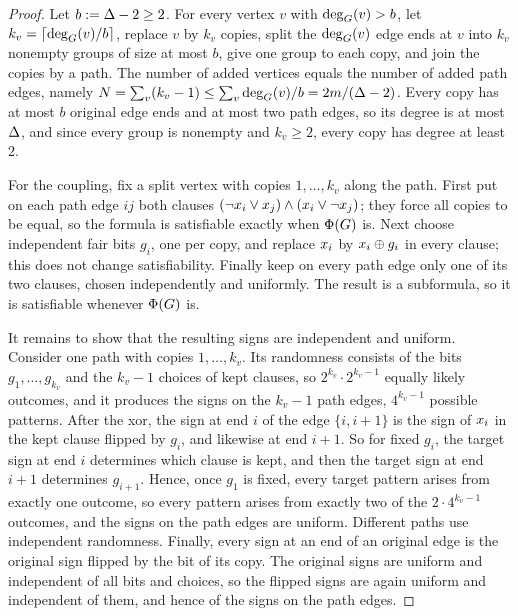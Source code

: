 \documentclass[11pt,a4paper]{article}
\theoremstyle{definition}
\theoremstyle{remark}
\theoremstyle{plain}
\theoremstyle{definition}
\begin{document}
\begin{proof}
Let \(b:=\Delta-2\ge2\). For every vertex \(v\) with \(\deg_{G}(v)>b\), let
\(k_v=\lceil\deg_{G}(v)/b\rceil\), replace \(v\) by \(k_v\) copies, split the
\(\deg_{G}(v)\) edge ends at \(v\) into \(k_v\) nonempty groups of size at most
\(b\), give one group to each copy, and join the copies by a path. The number
of added vertices equals the number of added path edges, namely
\(N=\sum_v(k_v-1)\le\sum_v\deg_{G}(v)/b=2m/(\Delta-2)\). Every copy has at most
\(b\) original edge ends and at most two path edges, so its degree is at most
\(\Delta\), and since every group is nonempty and \(k_v\ge2\), every copy has
degree at least \(2\).

For the coupling, fix a split vertex with copies \(1,\dots,k_v\) along the
path. First put on each path edge \(ij\) both clauses
\((\neg x_{i}\vee x_{j})\wedge(x_{i}\vee\neg x_{j})\); they force all copies to be
equal, so the formula is satisfiable exactly when \(\Phi(G)\) is. Next choose
independent fair bits \(g_i\), one per copy, and replace \(x_{i}\) by
\(x_{i}\oplus g_i\) in every clause; this does not change satisfiability.
Finally keep on every path edge only one of its two clauses, chosen
independently and uniformly. The result is a subformula, so it is satisfiable
whenever \(\Phi(G)\) is.

It remains to show that the resulting signs are independent and uniform.
Consider one path with copies \(1,\dots,k_v\). Its randomness consists of the
bits \(g_1,\dots,g_{k_v}\) and the \(k_v-1\) choices of kept clauses, so
\(2^{k_v}\cdot2^{k_v-1}\) equally likely outcomes, and it produces the signs
on the \(k_v-1\) path edges, \(4^{k_v-1}\) possible patterns. After the xor,
the sign at end \(i\) of the edge \(\{i,i+1\}\) is the sign of \(x_{i}\) in the
kept clause flipped by \(g_i\), and likewise at end \(i+1\). So for fixed
\(g_i\), the target sign at end \(i\) determines which clause is kept, and
then the target sign at end \(i+1\) determines \(g_{i+1}\). Hence, once
\(g_1\) is fixed, every target pattern arises from exactly one outcome, so
every pattern arises from exactly two of the \(2\cdot4^{k_v-1}\) outcomes, and
the signs on the path edges are uniform. Different paths use independent
randomness. Finally, every sign at an end of an original edge is the original
sign flipped by the bit of its copy. The original signs are uniform and
independent of all bits and choices, so the flipped signs are again uniform
and independent of them, and hence of the signs on the path edges.
\end{proof}
\end{document}

